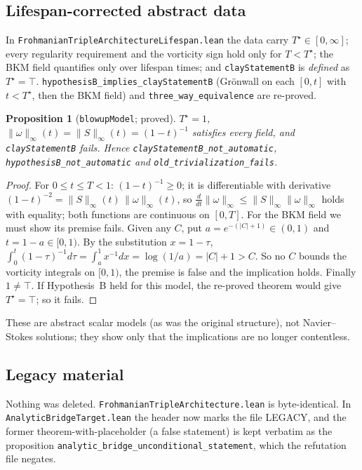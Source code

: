 \documentclass[11pt]{article}
\newtheorem{proposition}[theorem]{Proposition}
\theoremstyle{definition}
\newcommand{\Tstar}{T^\star}
\newcommand{\lean}[1]{\texttt{#1}}
\begin{document}
\subsection{Lifespan-corrected abstract data}
In \lean{FrohmanianTripleArchitectureLifespan.lean} the data carry
$\Tstar\in[0,\infty]$; every regularity requirement and the vorticity sign hold only for
$T<\Tstar$; the BKM field quantifies only over lifespan times; and
\lean{clayStatementB} is \emph{defined} as $\Tstar=\top$.
\lean{hypothesisB\_implies\_clayStatementB} (Grönwall on each $[0,t]$ with $t<\Tstar$,
then the BKM field) and \lean{three\_way\_equivalence} are re-proved.
\begin{proposition}[\lean{blowupModel}; proved]
$\Tstar=1$, $\|\omega\|_\infty(t)=\|S\|_\infty(t)=(1-t)^{-1}$ satisfies every field, and
\lean{clayStatementB} fails. Hence \lean{clayStatementB\_not\_automatic},
\lean{hypothesisB\_not\_automatic} and \lean{old\_trivialization\_fails}.
\end{proposition}
\begin{proof}
For $0\le t\le T<1$: $(1-t)^{-1}\ge0$; it is differentiable with derivative
$(1-t)^{-2}=\|S\|_\infty(t)\,\|\omega\|_\infty(t)$, so $\frac{d}{dt}\|\omega\|_\infty\le\|S\|_\infty\|\omega\|_\infty$ holds with equality; both functions are continuous
on $[0,T]$. For the BKM field we must show its premise fails. Given any $C$, put
$a=e^{-(|C|+1)}\in(0,1)$ and $t=1-a\in[0,1)$. By the substitution $x=1-\tau$,
$\int_0^t(1-\tau)^{-1}d\tau=\int_{a}^{1}x^{-1}dx=\log(1/a)=|C|+1>C$. So no $C$ bounds
the vorticity integrals on $[0,1)$, the premise is false and the implication holds.
Finally $1\ne\top$. If Hypothesis~B held for this model, the re-proved theorem would give
$\Tstar=\top$; so it fails.
\end{proof}
These are abstract scalar models (as was the original structure), not Navier--Stokes
solutions; they show only that the implications are no longer contentless.

\subsection{Legacy material}
Nothing was deleted. \lean{FrohmanianTripleArchitecture.lean} is byte-identical. In
\lean{AnalyticBridgeTarget.lean} the header now marks the file LEGACY, and the former
theorem-with-placeholder (a false statement) is kept verbatim as the proposition
\lean{analytic\_bridge\_unconditional\_statement}, which the refutation file negates.
\end{document}
